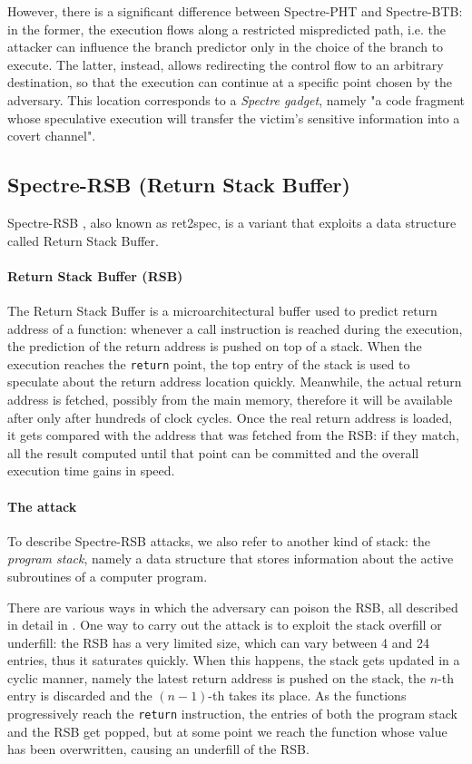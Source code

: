 \documentclass[12pt,a4paper]{book}
\theoremstyle{definition}
\begin{document}
	However, there is a significant difference between Spectre-PHT and Spectre-BTB: in the former, the execution flows along a restricted mispredicted path, i.e. the attacker can influence the branch predictor only in the choice of the branch to execute. The latter, instead, allows redirecting the control flow to an arbitrary destination, so that the execution can continue at a specific point chosen by the adversary. This location corresponds to a \textit{Spectre gadget}, namely "a code fragment whose speculative execution will transfer the victim’s sensitive information into a covert channel"\cite{Kocher2019}.
	
	\subsection{Spectre-RSB (Return Stack Buffer)}
	Spectre-RSB \cite{Maisuradze2018} \cite{Koruyeh2018} \cite{Canella2019}, also known as ret2spec, is a variant that exploits a data structure called Return Stack Buffer.
	
	\paragraph{Return Stack Buffer (RSB)}The Return Stack Buffer is a microarchitectural buffer used to predict return address of a function: whenever a call instruction is reached during the execution, the prediction of the return address is pushed on top of a stack. When the execution reaches the \texttt{return} point, the top entry of the stack is used to speculate about the return address location quickly. Meanwhile, the actual return address is fetched, possibly from the main memory, therefore it will be available after only after hundreds of clock cycles. Once the real return address is loaded, it gets compared with the address that was fetched from the RSB: if they match, all the result computed until that point can be committed and the overall execution time gains in speed.
	
	\paragraph{The attack} To describe Spectre-RSB attacks, we also refer to another kind of stack: the \textit{program stack}, namely a data structure that stores information about the active subroutines of a computer program.
	
	There are various ways in which the adversary can poison the RSB, all described in detail in \cite{Koruyeh2018}. One way to carry out the attack is to exploit the stack overfill or underfill: the RSB has a very limited size, which can vary between 4 and 24 entries, thus it saturates quickly. When this happens, the stack gets updated in a cyclic manner, namely the latest return address is pushed on the stack, the $n$-th entry is discarded and the $(n-1)$-th takes its place. As the functions progressively reach the \texttt{return} instruction, the entries of both the program stack and the RSB get popped, but at some point we reach the function whose value has been overwritten, causing an underfill of the RSB.
	
\end{document}
